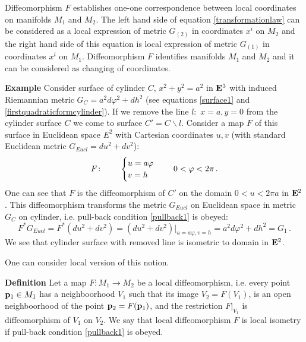 \documentclass[12pt]{article}
\theoremstyle{theorem}
\numberwithin{equation}{section}
\begin{document}
{Diffeomorphism $F$ establishes one-one correspondence between local
coordinates on manifolds $M_1$ and $M_2$.
The left hand side of equation \eqref{transformationlaw} can be
considered as a local expression of metric $G_{(2)}$ in coordinates
$x^i$ on $M_2$ and the right hand side of this equation is local
expression of metric $G_{(1)}$ in coordinates $x^i$ on $M_1$.
Diffeomorphism $F$ identifies manifolds $M_1$ and $M_2$
and it can be considered as changing of coordinates.



\m






{\bf Example} Consider surface of cylinder
$C$, $x^2+y^2=a^2$ in ${\bf E}^3$
with induced Riemannian metric
 $G_{C}=a^2 d\varphi^2+dh^2$ (see equations
\eqref{surface1} and \eqref{firstquadraticformcylinder}).
If we remove the line $l\colon\,\,x=a,y=0$
from the cylinder surface $C$ we come to
surface $C'=C\backslash l$.
Consider a map $F$ of this surface
in Euclidean space $E^2$ with Cartesian coordinates $u,v$
(with standard Euclidean metric $G_{Eucl}=du^2+dv^2$):
         \begin{equation}\label{diffofcylinderondomain}
        F\colon\qquad
        \begin{cases}
           u=a\varphi\cr
           v=h\cr
          \end{cases}\,\quad 0<\varphi < 2\pi\,.
           \end{equation}
One can see that $F$ is the diffeomorphism  of $C'$ on the domain
$0<u<2\pi a$ in ${\bf E}^2$. This diffeomorphism  transforms the metric
$G_{Eucl}$ on Euclidean space  in metric $G_{C}$ on cylinder, i.e.
pull-back condition \eqref{pullback1} is obeyed:
       $$
    F^*G_{Eucl}=F^*\left(du^2+dv^2\right)=
    \left(du^2+dv^2\right)\big\vert_{u=a\varphi,v=h}=
     a^2d\varphi^2+dh^2=G_1\,.
       $$
We see that cylinder surface with removed line is isometric to domain
in ${\bf E}^2$.



{\footnotesize One can consider local version of this notion.

{\bf Definition} Let  a map $F\colon M_1\to M_2$
be a local diffeomorphism, i.e. every point ${\bf p}_1\in M_1$
 has a neighboorhood $V_1$ such that its image $V_2=F(V_1)$,
is an open neighboorhood
of the point ${\bf p}_2=F({\bf p}_1)$, and the restriction
$F\big\vert_{V_1}$ is diffeomorphism of $V_1$ on $V_2$.
We say that local diffeomorphism $F$ is local isometry
if pull-back condition \eqref{pullback1} is obeyed.




}}
\end{document}
